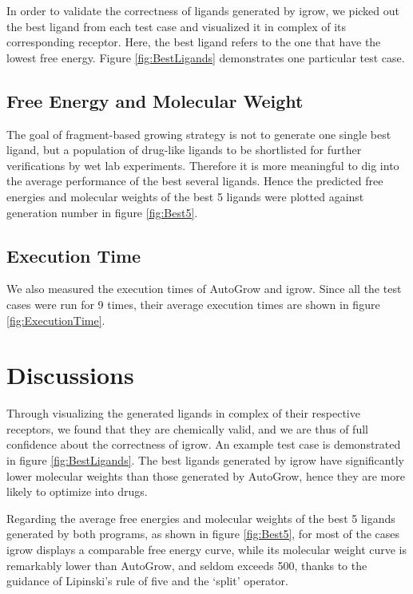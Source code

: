 \documentclass[10pt, conference, compsocconf]{IEEEtran}
\begin{document}
In order to validate the correctness of ligands generated by igrow, we picked out the best ligand from each test case and visualized it in complex of its corresponding receptor. Here, the best ligand refers to the one that have the lowest free energy.
Figure \ref{fig:BestLigands} demonstrates one particular test case.

\subsection{Free Energy and Molecular Weight}

The goal of fragment-based growing strategy is not to generate one single best ligand, but a population of drug-like ligands to be shortlisted for further verifications by wet lab experiments. Therefore it is more meaningful to dig into the average performance of the best several ligands. Hence the predicted free energies and molecular weights of the best 5 ligands were plotted against generation number in figure \ref{fig:Best5}.

\subsection{Execution Time}

We also measured the execution times of AutoGrow and igrow. Since all the test cases were run for 9 times, their average execution times are shown in figure \ref{fig:ExecutionTime}.

\section{Discussions}

Through visualizing the generated ligands in complex of their respective receptors, we found that they are chemically valid, and we are thus of full confidence about the correctness of igrow. An example test case is demonstrated in figure \ref {fig:BestLigands}.
The best ligands generated by igrow have significantly lower molecular weights than those generated by AutoGrow, hence they are more likely to optimize into drugs.

Regarding the average free energies and molecular weights of the best 5 ligands generated by both programs, as shown in figure \ref{fig:Best5}, for most of the cases igrow displays a comparable free energy curve, while its molecular weight curve is remarkably lower than AutoGrow, and seldom exceeds 500, thanks to the guidance of Lipinski's rule of five and the `split' operator.
\end{document}
